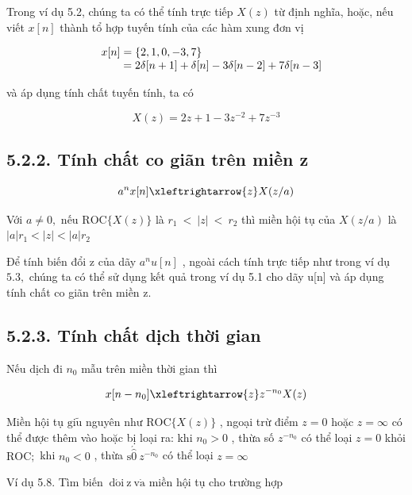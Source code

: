 \documentclass[
  10
]{article}
\begin{document}
Trong ví dụ 5.2, chúng ta có thể tính trực tiếp \(X ( z )\) từ định
nghĩa, hoặc, nếu viết \(x [ n ]\) thành tổ hợp tuyến tính của các hàm
xung đơn vị

\[
\begin{array}{r l} & {x [ n ] = \{2, 1, 0, - 3, 7 \}} \\ & {\qquad = 2 \delta [ n + 1 ] + \delta [ n ] - 3 \delta [ n - 2 ] + 7 \delta [ n - 3 ]} \end{array}
\]

và áp dụng tính chất tuyến tính, ta có

\[
X (z) = 2 z + 1 - 3 z ^ {- 2} + 7 z ^ {- 3}
\]

\subsection{5.2.2. Tính chất co giãn trên miền
z}\label{tuxednh-chux1ea5t-co-giuxe3n-truxean-miux1ec1n-z}

\[
a ^ {n} x [ n ] \xleftrightarrow {z} X (z / a)
\]

Với \(a \ne 0 ,\) nếu \(\mathrm { R O C } \{ X ( z ) \}\) là
\(r _ { 1 } ~ < ~ | z | ~ < ~ r _ { 2 }\) thì miền hội tụ của
\(X ( z / a )\) là \(| a | r _ { 1 } < | z | < | a | r _ { 2 }\)

Để tính biến đổi z của dãy \(a ^ { n } u [ n ]\) , ngoài cách tính trực
tiếp như trong ví dụ \(5 . 3 ,\) chúng ta có thể sử dụng kết quả trong
ví dụ 5.1 cho dãy u{[}n{]} và áp dụng tính chất co giãn trên miền z.

\subsection{5.2.3. Tính chất dịch thời
gian}\label{tuxednh-chux1ea5t-dux1ecbch-thux1eddi-gian-1}

Nếu dịch đi \(n _ { 0 }\) mẫu trên miền thời gian thì

\[
x [ n - n _ {0} ] \xleftrightarrow {z} z ^ {- n _ {0}} X (z)
\]

Miền hội tụ \(\mathrm { g i } \tilde { \mathrm { u } }\) nguyên như
\(\mathrm { R O C } \{ X ( z ) \}\) , ngoại trừ điểm \(z = 0\) hoặc
\(z = \infty\) có thể được thêm vào hoặc bị loại ra: khi
\(n _ { 0 } > 0\) , thừa số \(z ^ { - n _ { 0 } }\) có thể loại
\(z = 0\) khỏi \(\mathrm { R O C } ;\) khi \(n _ { 0 } < 0\) , thừa
\(\mathrm { s } \acute { \hat { 0 } } ~ z ^ { - n _ { 0 } }\) có thể
loại \(z = \infty\)

Ví dụ 5.8. Tìm biến
\(\mathrm { { \ d } \acute { o } i \ z \ v \dot { a } }\) miền hội tụ
cho trường hợp
\end{document}
